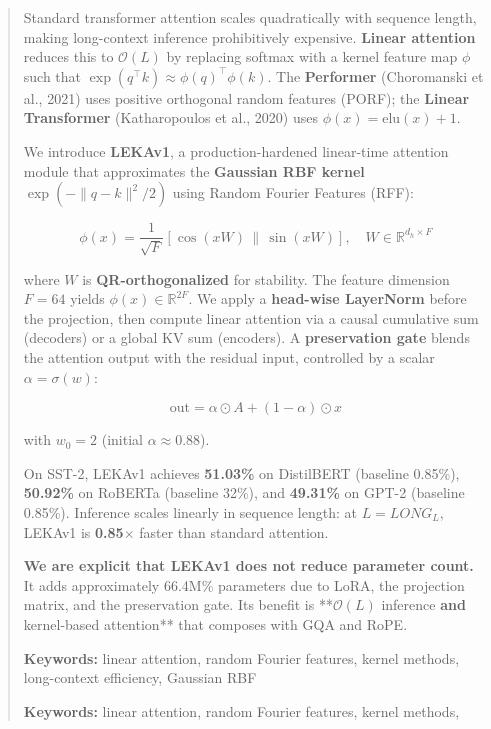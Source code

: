 \documentclass{article}
\begin{document}
\maketitle

\begin{abstract}
Standard transformer attention scales quadratically with sequence length, 
making long-context inference prohibitively expensive. \textbf{Linear attention} 
reduces this to $\mathcal{O}(L)$ by replacing softmax with a kernel 
feature map $\phi$ such that $\exp(q^\top k) \approx \phi(q)^\top \phi(k)$. 
The \textbf{Performer} (Choromanski et al., 2021) uses positive orthogonal 
random features (PORF); the \textbf{Linear Transformer} (Katharopoulos et al., 
2020) uses $\phi(x) = \text{elu}(x) + 1$.

We introduce \textbf{LEKAv1}, a production-hardened linear-time attention module 
that approximates the \textbf{Gaussian RBF kernel} $\exp(-\|q - k\|^2 / 2)$ 
using Random Fourier Features (RFF):

\[
\phi(x) = \frac{1}{\sqrt{F}} \left[ \cos(x W) \,\|\, \sin(x W) \right], 
\quad W \in \mathbb{R}^{d_h \times F}
\]

where $W$ is \textbf{QR-orthogonalized} for stability. The feature dimension 
$F = 64$ yields $\phi(x) \in \mathbb{R}^{2F}$. We apply a 
\textbf{head-wise LayerNorm} before the projection, then compute linear attention 
via a causal cumulative sum (decoders) or a global KV sum (encoders). A 
\textbf{preservation gate} blends the attention output with the residual 
input, controlled by a scalar $\alpha = \sigma(w)$:

\[
\text{out} = \alpha \odot A + (1 - \alpha) \odot x
\]

with $w_0 = 2$ (initial $\alpha \approx 0.88$).

On SST-2, LEKAv1 achieves \textbf{51.03\%} on DistilBERT (baseline 
0.85\%), \textbf{50.92\%} on RoBERTa (baseline 32\%), and 
\textbf{49.31\%} on GPT-2 (baseline 0.85\%). Inference scales linearly 
in sequence length: at $L = LONG_L$, LEKAv1 is \textbf{0.85$\times$} 
faster than standard attention.

\textbf{We are explicit that LEKAv1 does not reduce parameter count.} It adds 
approximately 66.4M\% parameters due to LoRA, the projection 
matrix, and the preservation gate. Its benefit is **$\mathcal{O}(L)$ 
inference\textbf{ and }kernel-based attention** that composes with GQA and 
RoPE.

\textbf{Keywords:} linear attention, random Fourier features, kernel methods, 
long-context efficiency, Gaussian RBF



\vspace{0.5em}
\noindent\textbf{Keywords:} linear attention, random Fourier features, kernel methods,
\end{abstract}
\end{document}
